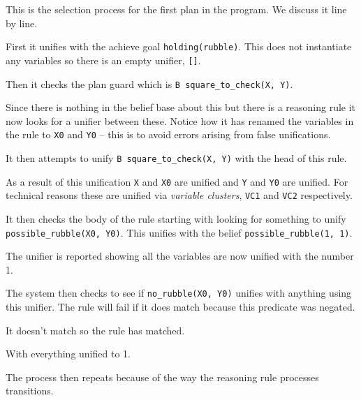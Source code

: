 This is the selection process for the first plan in the program.  We
discuss it line by line. 
\begin{itemize}
\item First it unifies with the achieve goal
  \texttt{holding(rubble)}.  This does not instantiate any variables
  so there is an empty unifier, \texttt{[]}.   
\item Then it checks the plan guard
  which is \lstinline{B square_to_check(X, Y)}.   
\item Since there is nothing in the belief base about
  this but there is a reasoning rule it now
  looks for a  unifier between these.  Notice how it
  has renamed the variables in the rule to
  \texttt{X0} and \texttt{Y0} -- this is to avoid errors arising from
  false unifications.   
\item It then attempts to unify \lstinline{B square_to_check(X, Y)}
  with the head of this rule. 
\item As a result of this unification \texttt{X}
  and \texttt{X0} are unified and \texttt{Y} and \texttt{Y0} are
  unified.  For technical reasons these are unified via \emph{variable
    clusters}, \texttt{VC1} and \texttt{VC2}
  respectively. 
\begin{sloppypar}
\item It then checks the body of the rule
  starting with looking for something to unify
  \texttt{possible\_rubble(X0, Y0)}.  This unifies
  with the belief \texttt{possible\_rubble(1, 1)}. 
\end{sloppypar}
\item The unifier is reported showing all the variables
  are now unified with the number 1. 
\item The system then checks to see if \texttt{no\_rubble(X0, Y0)}
  unifies with anything using this unifier.  The rule will fail if it does match because this predicate was
  negated. 
\item It doesn't match so the rule has matched.
\item With everything unified to 1.
\item The process then repeats because of the way the reasoning rule
  processes transitions. 
\end{itemize}


